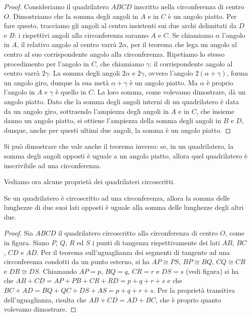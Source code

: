 \begin{proof}
Consideriamo il quadrilatero \(ABCD\) inscritto nella circonferenza di 
centro \(O\). Dimostriamo che la somma degli angoli in \(A\) e in \(C\) è 
un angolo piatto. Per fare questo, tracciamo gli angoli al centro 
insistenti sui due archi delimitati da \(D\) e \(B\): i rispettivi angoli 
alla circonferenza saranno \(A\) e \(C\). Se chiamiamo \(\alpha\) l'angolo 
in \(A\), il relativo angolo al centro varrà \( 2\alpha\), per il teorema 
che lega un angolo al centro al suo corrispondente angolo alla circonferenza. 
Ripetiamo lo stesso procedimento per l'angolo in \(C\), che chiamiamo 
\(\gamma\): il corrispondente angolo al centro varrà \(2\gamma\). La 
somma degli angoli \(2\alpha\) e \(2\gamma\), ovvero l'angolo 
\(2(\alpha+\gamma)\), forma un angolo giro, dunque la sua metà 
\(\alpha+\gamma\) è un angolo piatto. Ma \(\alpha\) è proprio l'angolo in 
\(A\) e \(\gamma\) è quello in \(C\). La loro somma, come volevamo 
dimostrare, dà un angolo piatto. Dato che la somma degli angoli 
interni di un quadrilatero è data da un angolo giro, sottraendo 
l'ampiezza degli angoli in \(A\) e in \(C\), che insieme danno un angolo 
piatto, si ottiene l'ampiezza della somma degli angoli in \(B\) e \(D\), 
dunque, anche per questi ultimi due angoli, la somma è un angolo 
piatto.
\end{proof}

Si può dimostrare che vale anche il teorema inverso: se, in un 
quadrilatero, la somma degli angoli opposti è uguale a un angolo 
piatto, allora quel quadrilatero è inscrivibile ad una circonferenza.

Vediamo ora alcune proprietà dei quadrilateri circoscritti.

\begin{teorema}\label{teo:6.6}
Se un quadrilatero è circoscritto ad una circonferenza, allora la 
somma delle lunghezze di due suoi lati opposti è uguale alla somma 
delle lunghezze degli altri due.
\end{teorema}


\begin{inaccessibleblock}
 \begin{figure}[htb]
  \centering
\end{figure}
\end{inaccessibleblock}

\begin{proof}
Sia \(ABCD\) il quadrilatero circoscritto alla circonferenza di centro 
\(O\), come in figura. Siano \(P\), \(Q\), \(R\) ed \(S\) i punti di tangenza 
rispettivamente dei lati \(AB\), \(BC\), \(CD\) e \(AD\). Per il teorema 
sull'uguaglianza dei segmenti di tangente ad una circonferenza 
condotti da un punto esterno, si ha \(AP\cong PS\), \(BP\cong BQ\), 
\(CQ\cong CR\) e \(DR\cong DS\). Chiamando \(AP=p\), \(BQ=q\), \(CR=r\) e 
\(DS=s\) (vedi figura) si ha che \(AB+CD = AP+PB+CR+RD = p+q+r+s\) e che 
\(BC+AD = BQ+QC+DS+AS = p+q+r+s\).
Per la proprietà transitiva dell'uguaglianza, risulta che 
\(AB+CD=AD+BC\), che è proprio quanto volevamo dimostrare.
\end{proof}

